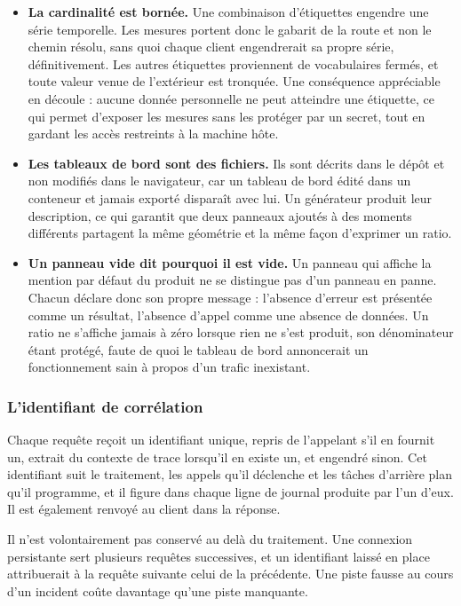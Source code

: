 \begin{itemize}
  \item \textbf{La cardinalité est bornée.} Une combinaison d'étiquettes engendre une série temporelle. Les mesures portent donc le gabarit de la route et non le chemin résolu, sans quoi chaque client engendrerait sa propre série, définitivement. Les autres étiquettes proviennent de vocabulaires fermés, et toute valeur venue de l'extérieur est tronquée. Une conséquence appréciable en découle : aucune donnée personnelle ne peut atteindre une étiquette, ce qui permet d'exposer les mesures sans les protéger par un secret, tout en gardant les accès restreints à la machine hôte.
  \item \textbf{Les tableaux de bord sont des fichiers.} Ils sont décrits dans le dépôt et non modifiés dans le navigateur, car un tableau de bord édité dans un conteneur et jamais exporté disparaît avec lui. Un générateur produit leur description, ce qui garantit que deux panneaux ajoutés à des moments différents partagent la même géométrie et la même façon d'exprimer un ratio.
  \item \textbf{Un panneau vide dit pourquoi il est vide.} Un panneau qui affiche la mention par défaut du produit ne se distingue pas d'un panneau en panne. Chacun déclare donc son propre message : l'absence d'erreur est présentée comme un résultat, l'absence d'appel comme une absence de données. Un ratio ne s'affiche jamais à zéro lorsque rien ne s'est produit, son dénominateur étant protégé, faute de quoi le tableau de bord annoncerait un fonctionnement sain à propos d'un trafic inexistant.
\end{itemize}

\subsubsection{L'identifiant de corrélation}

Chaque requête reçoit un identifiant unique, repris de l'appelant s'il en fournit un, extrait du contexte de trace lorsqu'il en existe un, et engendré sinon. Cet identifiant suit le traitement, les appels qu'il déclenche et les tâches d'arrière plan qu'il programme, et il figure dans chaque ligne de journal produite par l'un d'eux. Il est également renvoyé au client dans la réponse.

Il n'est volontairement pas conservé au delà du traitement. Une connexion persistante sert plusieurs requêtes successives, et un identifiant laissé en place attribuerait à la requête suivante celui de la précédente. Une piste fausse au cours d'un incident coûte davantage qu'une piste manquante.

